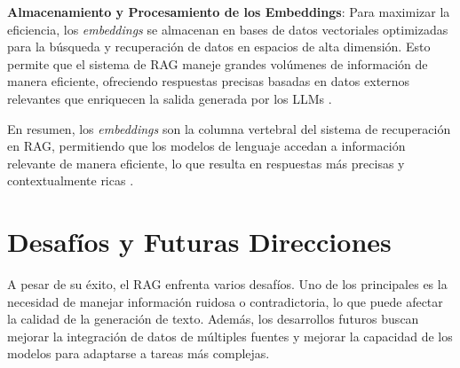 \textbf{Almacenamiento y Procesamiento de los Embeddings}: Para maximizar la eficiencia, los \textit{embeddings} se almacenan en bases de datos vectoriales optimizadas para la búsqueda y recuperación de datos en espacios de alta dimensión. Esto permite que el sistema de RAG maneje grandes volúmenes de información de manera eficiente, ofreciendo respuestas precisas basadas en datos externos relevantes que enriquecen la salida generada por los LLMs \cite{nanonets2023rag}.

En resumen, los \textit{embeddings} son la columna vertebral del sistema de recuperación en RAG, permitiendo que los modelos de lenguaje accedan a información relevante de manera eficiente, lo que resulta en respuestas más precisas y contextualmente ricas \cite{cloudgirl2023rag, nvidia2023rag}.


\section{Desafíos y Futuras Direcciones}

A pesar de su éxito, el RAG enfrenta varios desafíos. Uno de los principales es la necesidad de manejar información ruidosa o contradictoria, lo que puede afectar la calidad de la generación de texto. Además, los desarrollos futuros buscan mejorar la integración de datos de múltiples fuentes y mejorar la capacidad de los modelos para adaptarse a tareas más complejas.

